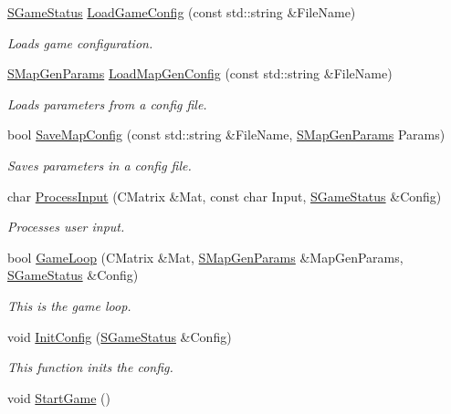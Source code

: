 \begin{DoxyCompactItemize}
\item 
\hyperlink{struct_chase_game_1_1_s_game_status}{S\-Game\-Status} \hyperlink{namespace_chase_game_addd460052ec5a5fe3010665ca84b07ec}{Load\-Game\-Config} (const std\-::string \&File\-Name)
\begin{DoxyCompactList}\small\item\em Loads game configuration. \end{DoxyCompactList}\item 
\hyperlink{struct_chase_game_1_1_s_map_gen_params}{S\-Map\-Gen\-Params} \hyperlink{namespace_chase_game_a9c5b5d91cb4251cae461faa4ace8a0cf}{Load\-Map\-Gen\-Config} (const std\-::string \&File\-Name)
\begin{DoxyCompactList}\small\item\em Loads parameters from a config file. \end{DoxyCompactList}\item 
bool \hyperlink{namespace_chase_game_aae169748faa735e395c14f13d2e3d77f}{Save\-Map\-Config} (const std\-::string \&File\-Name, \hyperlink{struct_chase_game_1_1_s_map_gen_params}{S\-Map\-Gen\-Params} Params)
\begin{DoxyCompactList}\small\item\em Saves parameters in a config file. \end{DoxyCompactList}\item 
char \hyperlink{namespace_chase_game_ab5112517855da810fe3b7bdb81d58484}{Process\-Input} (C\-Matrix \&Mat, const char Input, \hyperlink{struct_chase_game_1_1_s_game_status}{S\-Game\-Status} \&Config)
\begin{DoxyCompactList}\small\item\em Processes user input. \end{DoxyCompactList}\item 
bool \hyperlink{namespace_chase_game_a2bf846fb0618a485e9054b26555ed484}{Game\-Loop} (C\-Matrix \&Mat, \hyperlink{struct_chase_game_1_1_s_map_gen_params}{S\-Map\-Gen\-Params} \&Map\-Gen\-Params, \hyperlink{struct_chase_game_1_1_s_game_status}{S\-Game\-Status} \&Config)
\begin{DoxyCompactList}\small\item\em This is the game loop. \end{DoxyCompactList}\item 
void \hyperlink{namespace_chase_game_adab063b49bbe754d7cd4992b72da3746}{Init\-Config} (\hyperlink{struct_chase_game_1_1_s_game_status}{S\-Game\-Status} \&Config)
\begin{DoxyCompactList}\small\item\em This function inits the config. \end{DoxyCompactList}\item 
\hypertarget{namespace_chase_game_a528073d13296b3cf84a6ae07c3550e74}{void \hyperlink{namespace_chase_game_a528073d13296b3cf84a6ae07c3550e74}{Start\-Game} ()}\label{namespace_chase_game_a528073d13296b3cf84a6ae07c3550e74}


\end{DoxyCompactItemize}
